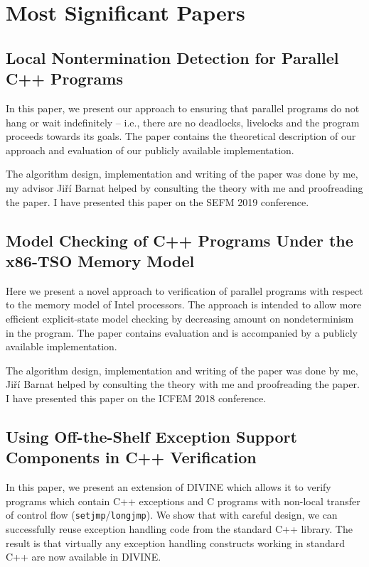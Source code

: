 \section{Most Significant Papers}

\subsection*{Local Nontermination Detection for Parallel C++ Programs}

In this paper, we present our approach to ensuring that parallel programs do not hang or wait indefinitely – i.e., there are no deadlocks, livelocks and the program proceeds towards its goals.
The paper contains the theoretical description of our approach and evaluation of our publicly available implementation.

The algorithm design, implementation and writing of the paper was done by me, my advisor Jiří Barnat helped by consulting the theory with me and proofreading the paper.
I have presented this paper on the SEFM 2019 conference.

\bigskip\noindent{}

\subsection*{Model Checking of C++ Programs Under the x86-TSO Memory Model}

Here we present a novel approach to verification of parallel programs with respect to the memory model of Intel processors.
The approach is intended to allow more efficient explicit-state model checking by decreasing amount on nondeterminism in the program.
The paper contains evaluation and is accompanied by a publicly available implementation.

The algorithm design, implementation and writing of the paper was done by me, Jiří Barnat helped by consulting the theory with me and proofreading the paper.
I have presented this paper on the ICFEM 2018 conference.

\bigskip\noindent{}

\subsection*{Using Off-the-Shelf Exception Support Components in C++ Verification}

In this paper, we present an extension of DIVINE which allows it to verify programs which contain C++ exceptions and C programs with non-local transfer of control flow (\texttt{setjmp}/\texttt{longjmp}).
We show that with careful design, we can successfully reuse exception handling code from the standard C++ library.
The result is that virtually any exception handling constructs working in standard C++ are now available in DIVINE.

